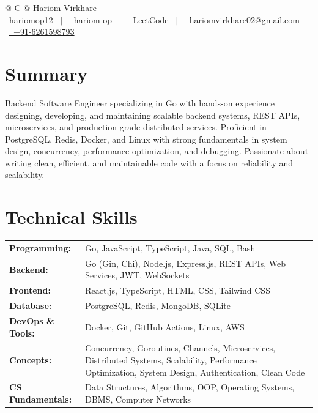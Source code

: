 \documentclass[a4paper,11pt]{article}
\begin{document}
\pagestyle{empty}

\begin{tabularx}{\linewidth}{@{} C @{}}
\Huge{Hariom Virkhare}\\[4pt]
\href{https://github.com/hariomop12}{\raisebox{-0.05\height}\faGithub\ hariomop12} \ $|$ \
\href{https://www.linkedin.com/in/hariom-op/}{\raisebox{-0.05\height}\faLinkedin\ hariom-op} \ $|$ \
\href{https://leetcode.com/u/hariomtanu/}{\raisebox{-0.05\height}\faCode\ LeetCode} \ $|$ \
\href{mailto:hariomvirkhare02@gmail.com}{\raisebox{-0.05\height}\faEnvelope\ hariomvirkhare02@gmail.com} \ $|$ \
\href{tel:+916261598793}{\raisebox{-0.05\height}\faMobile\ +91-6261598793}
\end{tabularx}

\section{Summary}
\vspace{-1pt}
Backend Software Engineer specializing in Go with hands-on experience designing, developing, and maintaining scalable backend systems, REST APIs, microservices, and production-grade distributed services. Proficient in PostgreSQL, Redis, Docker, and Linux with strong fundamentals in system design, concurrency, performance optimization, and debugging. Passionate about writing clean, efficient, and maintainable code with a focus on reliability and scalability.

\section{Technical Skills}
\vspace{-1pt}
\begin{tabularx}{\linewidth}{@{}l X@{}}
\textbf{Programming:} & \normalsize{Go, JavaScript, TypeScript, Java, SQL, Bash} \\
\textbf{Backend:} & \normalsize{Go (Gin, Chi), Node.js, Express.js, REST APIs, Web Services, JWT, WebSockets} \\
\textbf{Frontend:} & \normalsize{React.js, TypeScript, HTML, CSS, Tailwind CSS} \\
\textbf{Database:} & \normalsize{PostgreSQL, Redis, MongoDB, SQLite} \\
\textbf{DevOps \& Tools:} & \normalsize{Docker, Git, GitHub Actions, Linux, AWS} \\
\textbf{Concepts:} & \normalsize{Concurrency, Goroutines, Channels, Microservices, Distributed Systems, Scalability, Performance Optimization, System Design, Authentication, Clean Code} \\
\textbf{CS Fundamentals:} & \normalsize{Data Structures, Algorithms, OOP, Operating Systems, DBMS, Computer Networks} \\
\end{tabularx}
\end{document}
